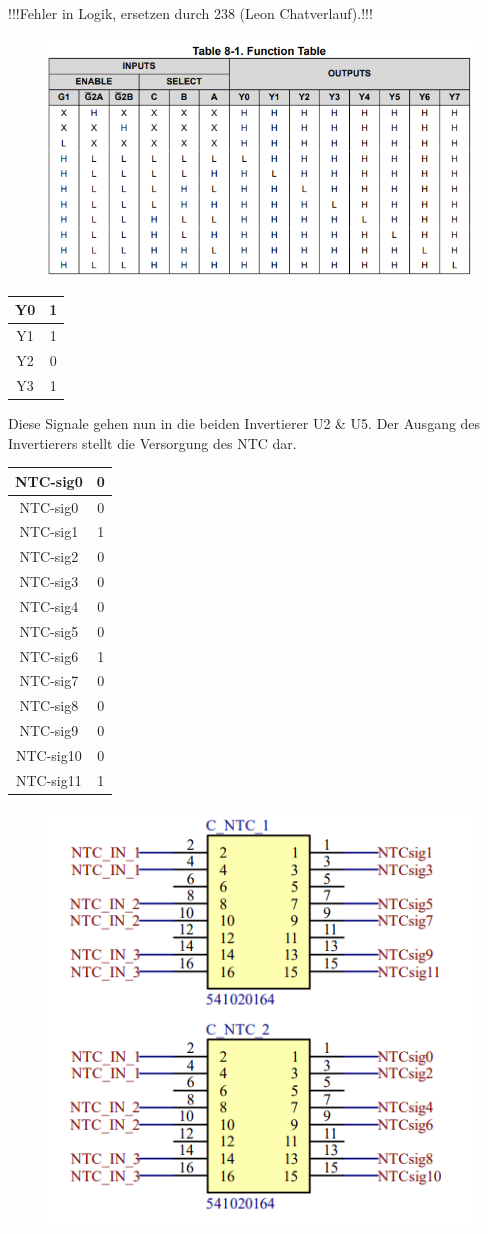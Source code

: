 !!!Fehler in Logik, ersetzen durch 238 (Leon Chatverlauf).!!!

\begin{figure}
	
	\centering
	\includegraphics[width=0.3\linewidth]{bilder/AMS_demuxer_logiktabelle}
	\caption{}
	\label{Demuxer_Logiktabelle}
	\label{fig:amsdemuxerlogiktabelle}
\end{figure}

\FloatBarrier
\begin{table}
	\centering
	\begin{tabular}{|c|c|}
		\hline
		Y0 & 1 \\
		\hline
		Y1 & 1 \\
		\hline
		Y2 & 0 \\
		\hline
		Y3 & 1 \\
		\hline
	\end{tabular}
\end{table}

Diese Signale gehen nun in die beiden Invertierer U2 \& U5. Der Ausgang des Invertierers stellt die Versorgung des NTC dar.

\begin{table}
	\centering
	\begin{tabular}{|c|c|}
		\hline
		NTC-sig0 & 0 \\
		\hline
		NTC-sig0 & 0 \\
		\hline
		NTC-sig1 & 1 \\
		\hline
		NTC-sig2 & 0 \\
		\hline
		NTC-sig3 & 0 \\
		\hline
		NTC-sig4 & 0 \\
		\hline
		NTC-sig5 & 0 \\
		\hline
		NTC-sig6 & 1 \\
		\hline
		NTC-sig7 & 0 \\
		\hline
		NTC-sig8 & 0 \\
		\hline
		NTC-sig9 & 0 \\
		\hline
		NTC-sig10 & 0 \\
		\hline
		NTC-sig11 & 1 \\
		\hline
	\end{tabular}
\end{table}

\begin{figure}
	\centering
	\includegraphics[width=0.3\linewidth]{bilder/AMS_NTC_steckerlayout}
	\caption{}
	\label{fig:amsntcsteckerlayout}
\end{figure}

